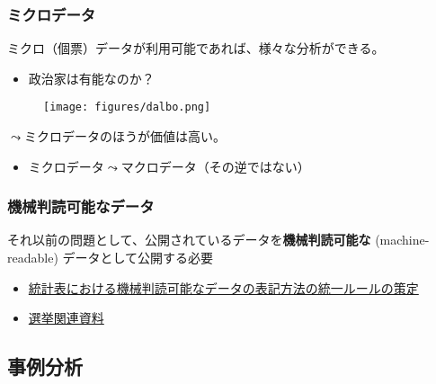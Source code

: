 \documentclass[
  xelatex,
  ja=standard]{bxjsarticle}
\providecommand{\tightlist}{%
  \setlength{\itemsep}{0pt}\setlength{\parskip}{0pt}}\usepackage{longtable,booktabs,array}
\begin{document}
\hypertarget{ux30dfux30afux30edux30c7ux30fcux30bf}{%
\subsubsection{ミクロデータ}\label{ux30dfux30afux30edux30c7ux30fcux30bf}}

ミクロ（個票）データが利用可能であれば、様々な分析ができる。

\begin{itemize}
\tightlist
\item
  政治家は有能なのか？
\end{itemize}

\begin{figure}[htpb]

{\centering \texttt{[image: figures/dalbo.png]}

}

\caption{\citet{dal2017}}

\end{figure}

\(\leadsto\)ミクロデータのほうが価値は高い。

\begin{itemize}
\tightlist
\item
  ミクロデータ\(\leadsto\)マクロデータ（その逆ではない）
\end{itemize}

\hypertarget{ux6a5fux68b0ux5224ux8aadux53efux80fdux306aux30c7ux30fcux30bf}{%
\subsubsection{機械判読可能なデータ}\label{ux6a5fux68b0ux5224ux8aadux53efux80fdux306aux30c7ux30fcux30bf}}

それ以前の問題として、公開されているデータを\textbf{機械判読可能な}
(machine-readable) データとして公開する必要

\begin{itemize}
\tightlist
\item
  \href{https://www.soumu.go.jp/menu_news/s-news/01toukatsu01_02000186.html}{統計表における機械判読可能なデータの表記方法の統一ルールの策定}
\item
  \href{https://www.soumu.go.jp/senkyo/senkyo_s/data/index.html}{選挙関連資料}
\end{itemize}

\hypertarget{ux4e8bux4f8bux5206ux6790}{%
\subsection{事例分析}\label{ux4e8bux4f8bux5206ux6790}}
\end{document}
